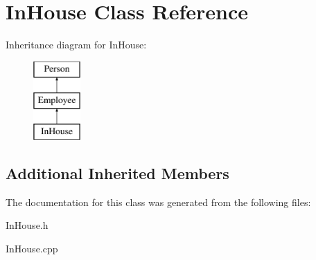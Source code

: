 \hypertarget{class_in_house}{}\section{In\+House Class Reference}
\label{class_in_house}
Inheritance diagram for In\+House\+:\begin{figure}[H]
\begin{center}
\leavevmode
\includegraphics[height=3.000000cm]{class_in_house}
\end{center}
\end{figure}
\subsection*{Additional Inherited Members}


The documentation for this class was generated from the following files\+:\begin{DoxyCompactItemize}
\item 
In\+House.\+h\item 
In\+House.\+cpp\end{DoxyCompactItemize}
